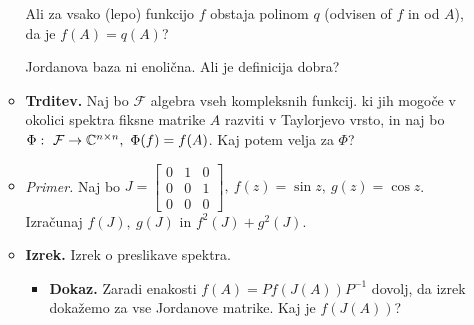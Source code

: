 \begin{enumerate}
\begin{itemize}
        Ali za vsako (lepo) funkcijo $f$ obstaja polinom $q$ (odvisen of $f$ in od $A$), da je $f(A) = q(A)$?

        Jordanova baza ni enolična. Ali je definicija dobra?
        \item \colorbox{blue!30}{\textbf{Trditev.}} Naj bo $\mathcal{F}$ algebra vseh kompleksnih funkcij. ki jih mogoče v okolici spektra fiksne matrike $A$ razviti v Taylorjevo vrsto, in naj bo $\Phi: \ \mathcal{F} \to \CC^{n \times n}, \ \Phi(f) = f(A)$. Kaj potem velja za $\Phi$?
        \item \colorbox{yellow!30}{\emph{Primer.}} Naj bo $J = \begin{bmatrix}
            0 & 1 & 0 \\
            0 & 0 & 1 \\
            0 & 0 & 0
        \end{bmatrix}, \ f(z) = \sin z, \ g(z) = \cos z$. Izračunaj $f(J), \ g(J)$ in $f^2(J) + g^2(J)$.
        \item \colorbox{blue!30}{\textbf{Izrek.}} Izrek o preslikave spektra.
        \begin{itemize}
            \item \colorbox{green!30}{\textbf{Dokaz.}} Zaradi enakosti $f(A) = Pf(J(A))P^{-1}$ dovolj, da izrek dokažemo za vse Jordanove matrike. Kaj je $f(J(A))$?
        \end{itemize} 
    \end{itemize}    
\end{enumerate}

\newpage
\